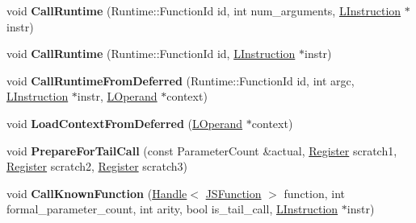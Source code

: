 \begin{DoxyCompactItemize}
\item 
void {\bfseries Call\+Runtime} (Runtime\+::\+Function\+Id id, int num\+\_\+arguments, \hyperlink{classv8_1_1internal_1_1_l_instruction}{L\+Instruction} $\ast$instr)\hypertarget{classv8_1_1internal_1_1_l_code_gen_ac16bd03d079fe227358121f48075b4b7}{}\label{classv8_1_1internal_1_1_l_code_gen_ac16bd03d079fe227358121f48075b4b7}

\item 
void {\bfseries Call\+Runtime} (Runtime\+::\+Function\+Id id, \hyperlink{classv8_1_1internal_1_1_l_instruction}{L\+Instruction} $\ast$instr)\hypertarget{classv8_1_1internal_1_1_l_code_gen_a5a8eebd32428c2f6904e2875a4dbbb18}{}\label{classv8_1_1internal_1_1_l_code_gen_a5a8eebd32428c2f6904e2875a4dbbb18}

\item 
void {\bfseries Call\+Runtime\+From\+Deferred} (Runtime\+::\+Function\+Id id, int argc, \hyperlink{classv8_1_1internal_1_1_l_instruction}{L\+Instruction} $\ast$instr, \hyperlink{classv8_1_1internal_1_1_l_operand}{L\+Operand} $\ast$context)\hypertarget{classv8_1_1internal_1_1_l_code_gen_a4c3be7c7de6a86615c912e70cfc04ab4}{}\label{classv8_1_1internal_1_1_l_code_gen_a4c3be7c7de6a86615c912e70cfc04ab4}

\item 
void {\bfseries Load\+Context\+From\+Deferred} (\hyperlink{classv8_1_1internal_1_1_l_operand}{L\+Operand} $\ast$context)\hypertarget{classv8_1_1internal_1_1_l_code_gen_a9009104c76636c80f382e04c1dd304ca}{}\label{classv8_1_1internal_1_1_l_code_gen_a9009104c76636c80f382e04c1dd304ca}

\item 
void {\bfseries Prepare\+For\+Tail\+Call} (const Parameter\+Count \&actual, \hyperlink{structv8_1_1internal_1_1_register}{Register} scratch1, \hyperlink{structv8_1_1internal_1_1_register}{Register} scratch2, \hyperlink{structv8_1_1internal_1_1_register}{Register} scratch3)\hypertarget{classv8_1_1internal_1_1_l_code_gen_ac244b5f30d2995d51f6d263358a7ccd9}{}\label{classv8_1_1internal_1_1_l_code_gen_ac244b5f30d2995d51f6d263358a7ccd9}

\item 
void {\bfseries Call\+Known\+Function} (\hyperlink{classv8_1_1internal_1_1_handle}{Handle}$<$ \hyperlink{classv8_1_1internal_1_1_j_s_function}{J\+S\+Function} $>$ function, int formal\+\_\+parameter\+\_\+count, int arity, bool is\+\_\+tail\+\_\+call, \hyperlink{classv8_1_1internal_1_1_l_instruction}{L\+Instruction} $\ast$instr)\hypertarget{classv8_1_1internal_1_1_l_code_gen_adec87ca608c3363d2fa40b37952378b9}{}\label{classv8_1_1internal_1_1_l_code_gen_adec87ca608c3363d2fa40b37952378b9}


\end{DoxyCompactItemize}
